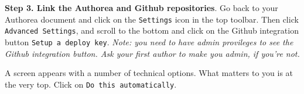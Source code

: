 \textbf{Step 3. Link the Authorea and Github repositories}. Go back to your Authorea document and click on the \verb|Settings| icon in the top toolbar. Then click \verb|Advanced Settings|, and scroll to the bottom and click on the Github integration button \verb|Setup a deploy key|. \textit{Note: you need to have admin provileges to see the Github integration button. Ask your first author to make you admin, if you're not.} 

A screen appears with a number of technical options. What matters to you is at the very top. Click on \verb|Do this automatically|. 